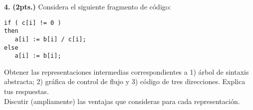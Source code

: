 \textbf{4.} \textbf{(2pts.)} Considera el siguiente fragmento de c\'odigo:
\begin{lstlisting}
if ( c[i] != 0 )
then 
   a[i] := b[i] / c[i];
else 
   a[i] := b[i];
\end{lstlisting}
Obtener las representaciones intermedias correspondientes a 1) \'arbol de 
sintaxis abstracta; 2) gr\'afica de control de flujo y 3) c\'odigo de tres 
direcciones. Explica tus respuestas. \\
Discutir (ampliamente) las ventajas que consideras para cada representaci\'on.
